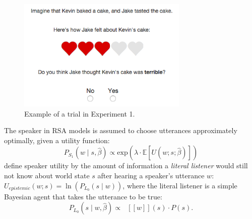 \documentclass[10pt,letterpaper]{article}
\newcommand{\denote}[1]{\mbox{ $[\![ #1 ]\!]$}}
\begin{document}
\begin{figure}[t]
\begin{centering}
\includegraphics[width=3.2in]{figures/example.png}
\caption{\label{fig:ex} Example of a trial in Experiment 1.}
\end{centering}
\end{figure}

The speaker in RSA models is assumed to choose utterances approximately optimally, given a utility function:
\begin{equation}
P_{S_1}(w \mid s, \hat{\beta}) \propto \mathrm{exp}(\lambda \cdot \mathbb{E}[U(w; s;  \hat{\beta})])\label{eq:S1}
\end{equation}
 define speaker utility by the amount of information a \emph{literal listener} would still not know about world state $s$ after hearing a speaker's utterance $w$:
$U_{epistemic}(w; s) = \ln(P_{L_0}(s \mid w)) $,
where the literal listener is a simple Bayesian agent that takes the utterance to be true:
\begin{equation}
P_{L_0}(s \mid w,  \hat{\beta})\propto \denote{w}(s) \cdot P(s) \label{eq:L0}.
\end{equation}
\end{document}
